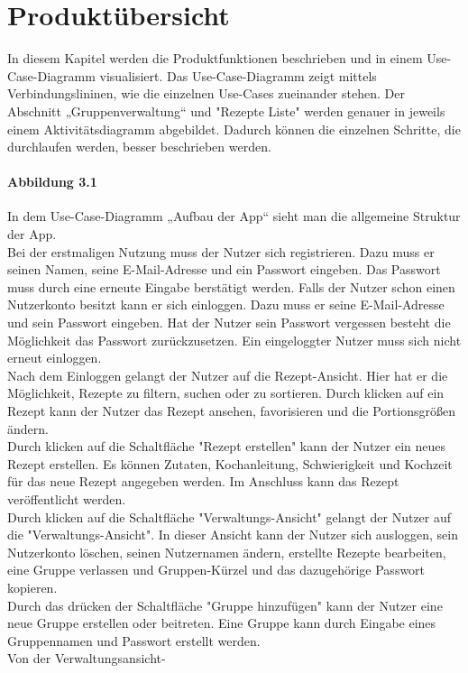 \documentclass[parskip=full]{scrartcl}
\begin{document}
\section{Produktübersicht}
In diesem Kapitel werden die Produktfunktionen beschrieben und in einem Use-Case-Diagramm visualisiert.
Das Use-Case-Diagramm zeigt mittels Verbindungslininen, wie die einzelnen Use-Cases zueinander stehen.
Der Abschnitt „Gruppenverwaltung“ und "Rezepte Liste" werden genauer in jeweils einem Aktivitätsdiagramm abgebildet.
Dadurch können die einzelnen Schritte, die durchlaufen werden, besser beschrieben werden.

\paragraph{Abbildung 3.1}
In dem Use-Case-Diagramm „Aufbau der App“ sieht man die allgemeine Struktur der App.\\
Bei der erstmaligen Nutzung muss der Nutzer sich registrieren.
Dazu muss er seinen Namen, seine E-Mail-Adresse und ein Passwort eingeben.
Das Passwort muss durch eine erneute Eingabe berstätigt werden.
Falls der Nutzer schon einen Nutzerkonto besitzt kann er sich einloggen.
Dazu muss er seine E-Mail-Adresse und sein Passwort eingeben.
Hat der Nutzer sein Passwort vergessen besteht die Möglichkeit das Passwort zurückzusetzen.
Ein eingeloggter Nutzer muss sich nicht erneut einloggen.\\
Nach dem Einloggen gelangt der Nutzer auf die Rezept-Ansicht.
Hier hat er die Möglichkeit, Rezepte zu filtern, suchen oder zu sortieren.
Durch klicken auf ein Rezept kann der Nutzer das Rezept ansehen, favorisieren und die Portionsgrößen ändern.\\
Durch klicken auf die Schaltfläche "Rezept erstellen" kann der Nutzer ein neues Rezept erstellen.
Es können Zutaten, Kochanleitung, Schwierigkeit und Kochzeit ƒür das neue Rezept angegeben werden.
Im Anschluss kann das Rezept veröffentlicht werden.\\
Durch klicken auf die Schaltfläche "Verwaltungs-Ansicht" gelangt der Nutzer auf die "Verwaltungs-Ansicht".
In dieser Ansicht kann der Nutzer sich ausloggen, sein Nutzerkonto löschen, seinen Nutzernamen ändern, 
erstellte Rezepte bearbeiten, eine Gruppe verlassen und Gruppen-Kürzel und das dazugehörige Passwort kopieren.\\
Durch das drücken der Schaltfläche "Gruppe hinzufügen" kann der Nutzer eine neue Gruppe erstellen oder beitreten.
Eine Gruppe kann durch Eingabe eines Gruppennamen und Passwort erstellt werden.\\ %
Von der Verwaltungsansicht-
\end{document}
